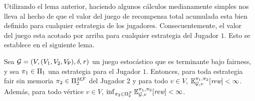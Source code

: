 



Utilizando el lema anterior, haciendo algunos cálculos medianamente simples nos lleva al hecho de que el valor del juego de recompensa total acumulada esta bien definido para cualquier estrategia de los jugadores.
%
Consecuentemente, el valor del juego esta acotado por arriba para cualquier estrategia del Jugador $1$.
%
Esto se establece en el siguiente lema.

\begin{lemma}\label{lm:memoryless-strat-p2-bounded-expectation}
  Sea $\mathcal{G}= (V, (V_1, V_2, V_{\mathsf{P}}), \delta, \mathit{r})$ un
  juego estocástico que es terminante bajo fairness, y sea
  $\pi_{1} \in \Pi_{1}$ una estrategia para el Jugador $1$.
  Entonces, para toda estrategia fair sin memoria
  $\pi_{2} \in \Pi^{\textit{M}\mathcal{F}}_{2}$ del Jugador $2$
  y para todo $v \in V$,
  $\mathbb{E}^{\pi_{1}, \pi_{2}}_{\mathcal{G},v}[\textit{rew}] < \infty$.
  Además, para todo vértice $v \in V$,
  $\inf_{\pi_{2} \in \Pi^{\mathcal{F}}_{2}} \mathbb{E}^{\pi_{1}, \pi_{2}}_{\mathcal{G},v}[\textit{rew}] < \infty$.
\end{lemma}

